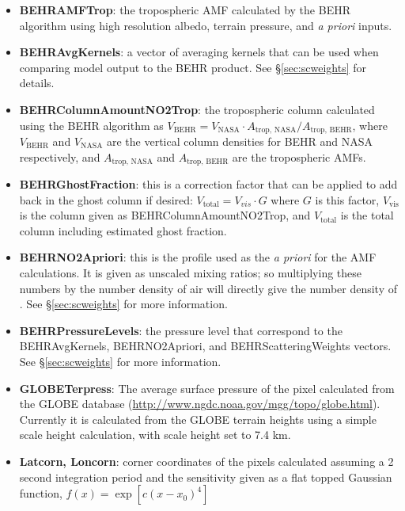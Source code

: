 \documentclass[12pt]{article}
\begin{document}
	\begin{itemize}
	\item \textbf{BEHRAMFTrop}: the tropospheric AMF calculated by the BEHR algorithm using high resolution albedo, terrain pressure, and  \emph{a priori} inputs.
	
	\item \textbf{BEHRAvgKernels}: a vector of averaging kernels that can be used when comparing model output to the BEHR product. See \S\ref{sec:scweights} for details.
	
	\item \textbf{BEHRColumnAmountNO2Trop}: the tropospheric  column calculated using the BEHR algorithm as $V_{\mathrm{BEHR}} = V_{\mathrm{NASA}} \cdot A_{\text{trop, NASA}} / A_{\text{trop, BEHR}}$, where $V_{\mathrm{BEHR}}$ and $V_{\mathrm{NASA}}$ are the vertical column densities for BEHR and NASA respectively, and $A_{\text{trop, NASA}}$ and $A_{\text{trop, BEHR}}$ are the tropospheric AMFs.
	
	\item \textbf{BEHRGhostFraction}: this is a correction factor that can be applied to add back in the ghost column if desired: $V_{\mathrm{total}} = V_{vis} \cdot G$ where $G$ is this factor, $V_{\mathrm{vis}}$ is the column given as BEHRColumnAmountNO2Trop, and $V_{\mathrm{total}}$ is the total column including estimated ghost fraction.
	
	\item \textbf{BEHRNO2Apriori}: this is the  profile used as the \emph{a priori} for the AMF calculations. It is given as unscaled mixing ratios; so multiplying these numbers by the number density of air will directly give the number density of . See \S\ref{sec:scweights} for more information.
	
	\item \textbf{BEHRPressureLevels}: the pressure level that correspond to the BEHRAvgKernels, BEHRNO2Apriori, and BEHRScatteringWeights vectors. See \S\ref{sec:scweights} for more information.
	
	\item \textbf{GLOBETerpress}: The average surface pressure of the pixel calculated from the GLOBE database (\url{http://www.ngdc.noaa.gov/mgg/topo/globe.html}). Currently it is calculated from the GLOBE terrain heights using a simple scale height calculation, with scale height set to 7.4 km.
	
	\item \textbf{Latcorn, Loncorn}: corner coordinates of the pixels calculated assuming a 2 second integration period and the sensitivity given as a flat topped Gaussian function, $f(x) = \exp[c(x - x_0)^4]$
	

\end{itemize}
\end{document}
